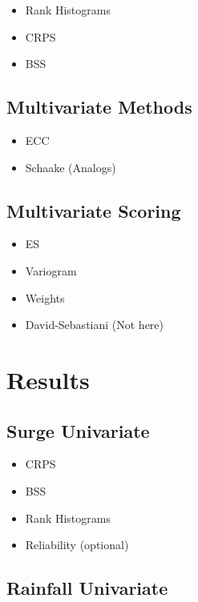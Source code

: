 \documentclass[]{article}
\begin{document}
\begin{itemize}
\item
  Rank Histograms
\item
  CRPS
\item
  BSS
\end{itemize}

\subsection{Multivariate Methods}\label{multivariate-methods}

\begin{itemize}
\item
  ECC
\item
  Schaake (Analogs)
\end{itemize}

\subsection{Multivariate Scoring}\label{multivariate-scoring}

\begin{itemize}
\item
  ES
\item
  Variogram
\item
  Weights
\item
  David-Sebastiani (Not here)
\end{itemize}

\section{Results}\label{results}

\subsection{Surge Univariate}\label{surge-univariate}

\begin{itemize}
\item
  CRPS
\item
  BSS
\item
  Rank Histograms
\item
  Reliability (optional)
\end{itemize}

\subsection{Rainfall Univariate}\label{rainfall-univariate}
\end{document}
